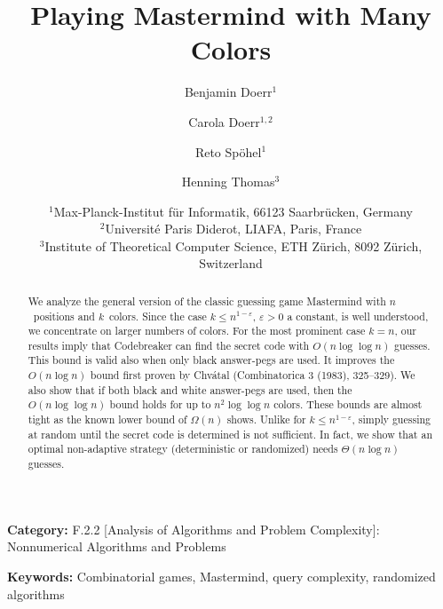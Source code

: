 \documentclass[english,a4paper,11pt]{article}
\begin{document}
\title{Playing Mastermind with Many Colors}

\author{Benjamin Doerr$^1$ \and Carola Doerr$^{1,2}$ \and Reto Sp\"{o}hel$^1$ \and Henning Thomas$^3$}


\date{$^1$Max-Planck-Institut f{\"u}r Informatik, 66123 Saarbr{\"u}cken, Germany \\
$^2$Universit\'{e} Paris Diderot, LIAFA, Paris, France\\
$^3$Institute of Theoretical Computer Science, ETH Z\"urich, 8092 Z\"urich, Switzerland}

\maketitle

\begin{abstract}
We analyze the general version of the classic guessing game  Mastermind with $n$~positions and $k$~colors. Since the case $k \le n^{1-\varepsilon}$, $\varepsilon>0$ a constant, is well understood, we concentrate on larger numbers of colors. For the most prominent case $k = n$, our results imply that Codebreaker can find the secret code with $O(n \log \log n)$ guesses. This bound is valid also when only black answer-pegs are used. It improves the $O(n \log n)$ bound first proven by Chv\'atal (Combinatorica 3 (1983), 325--329). We also show that if both black and white answer-pegs are used, then the $O(n \log\log n)$ bound holds for up to $n^2 \log\log n$ colors. These bounds are almost tight as the known lower bound of $\Omega(n)$ shows. Unlike for $k \le n^{1-\varepsilon}$, simply guessing at random until the secret code is determined is not sufficient. In fact, we show that an optimal non-adaptive strategy (deterministic or randomized) needs $\Theta(n \log n)$ guesses.
\end{abstract}

\textbf{Category:} F.2.2 [Analysis of Algorithms and Problem Complexity]: Nonnumerical Algorithms and Problems

\textbf{Keywords:} Combinatorial games, Mastermind, query complexity, randomized algorithms


\maketitle
\end{document}
